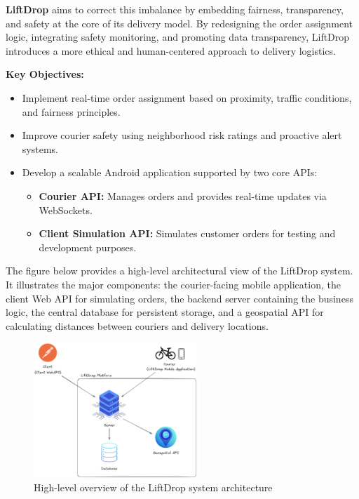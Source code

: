 \bigskip

\textbf{LiftDrop} aims to correct this imbalance by embedding fairness, transparency, and safety at the core of its delivery model. By redesigning the order assignment logic, integrating safety monitoring, and promoting data transparency, LiftDrop introduces a more ethical and human-centered approach to delivery logistics.

\bigskip

\textbf{Key Objectives:}

\begin{itemize}
    \item Implement real-time order assignment based on proximity, traffic conditions, and fairness principles.
    \item Improve courier safety using neighborhood risk ratings and proactive alert systems.
    \item Develop a scalable Android application supported by two core APIs:
    \begin{itemize}
        \item \textbf{Courier API:} Manages orders and provides real-time updates via WebSockets.
        \item \textbf{Client Simulation API:} Simulates customer orders for testing and development purposes.
    \end{itemize}
\end{itemize}

\noindent
The figure below provides a high-level architectural view of the LiftDrop system. It illustrates the major components: the courier-facing mobile application, the client Web API for simulating orders, the backend server containing the business logic, the central database for persistent storage, and a geospatial API for calculating distances between couriers and delivery locations.

\bigskip

\begin{figure}[H]
    \centering
    \includegraphics[width=0.55\textwidth]{images/LiftDrop_High_level_view.png}
    \caption{High-level overview of the LiftDrop system architecture}
    \label{fig:high-level-Overview}
\end{figure}


